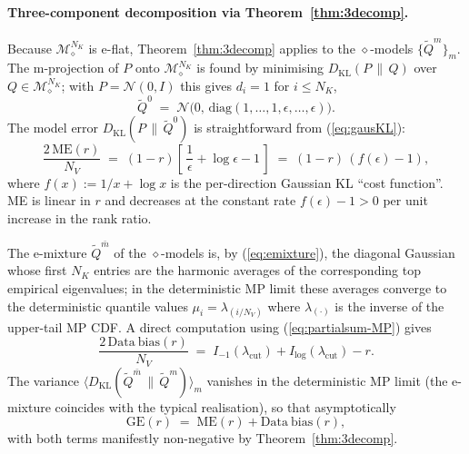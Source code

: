 \documentclass[11pt,a4paper]{article}
\theoremstyle{definition}
\theoremstyle{remark}
\newcommand{\KL}{D_{\mathrm{KL}}}
\newcommand{\PV}{P}
\newcommand{\NK}{N_K}
\newcommand{\NV}{N_V}
\newcommand{\Mfam}{\mathcal{M}}
\begin{document}
\paragraph{Three-component decomposition via Theorem~\ref{thm:3decomp}.}
Because $\Mfam_{\diamond}^{\NK}$ is e-flat,
Theorem~\ref{thm:3decomp} applies to the $\diamond$-models
$\{\widetilde{Q}^{m}\}_{m}$. The m-projection of $\PV$ onto
$\Mfam_{\diamond}^{\NK}$ is found by minimising
$\KL(\PV \,\|\, Q)$ over $Q \in \Mfam_{\diamond}^{\NK}$; with
$\PV = \mathcal{N}(0, I)$ this gives $d_{i} = 1$ for $i \leq \NK$,
\begin{equation}
  \widetilde{Q}^{0}
  \;=\;
  \mathcal{N}\!\big(0,\, \mathrm{diag}(1,\ldots,1,
                                        \epsilon,\ldots,\epsilon)\big).
  \label{eq:Q0diamond}
\end{equation}
The model error $\KL(\PV \,\|\, \widetilde{Q}^{0})$ is
straightforward from (\ref{eq:gausKL}):
\begin{equation}
  \frac{2\,\mathrm{ME}(r)}{\NV}
  \;=\;
  (1-r)\!\left[\,\frac{1}{\epsilon} + \log\epsilon - 1\,\right]
  \;=\;
  (1-r)\,(f(\epsilon) - 1),
  \label{eq:ME-r}
\end{equation}
where $f(x) := 1/x + \log x$ is the per-direction Gaussian KL
``cost function''. ME is linear in $r$ and decreases at the
constant rate $f(\epsilon) - 1 > 0$ per unit increase in the
rank ratio.

The e-mixture $\widetilde{Q}^{\bar{m}}$ of the $\diamond$-models
is, by (\ref{eq:emixture}), the diagonal Gaussian whose first
$\NK$ entries are the harmonic averages of the corresponding
top empirical eigenvalues; in the deterministic MP limit these
averages converge to the deterministic quantile values
$\mu_{i} = \lambda_{(i/\NV)}$ where $\lambda_{(\cdot)}$ is the
inverse of the upper-tail MP CDF. A direct computation using
(\ref{eq:partialsum-MP}) gives
\begin{equation}
  \frac{2\,\mathrm{Data\ bias}(r)}{\NV}
  \;=\;
  I_{-1}(\lambda_{\mathrm{cut}}) + I_{\log}(\lambda_{\mathrm{cut}}) - r .
  \label{eq:DB-r}
\end{equation}
The variance $\langle\KL(\widetilde{Q}^{\bar{m}}\,\|\,
\widetilde{Q}^{m})\rangle_{m}$ vanishes in the deterministic
MP limit (the e-mixture coincides with the typical realisation),
so that asymptotically
\begin{equation}
  \mathrm{GE}(r) \;=\; \mathrm{ME}(r) + \mathrm{Data\ bias}(r) ,
  \label{eq:GE-decomp-asymp}
\end{equation}
with both terms manifestly non-negative by
Theorem~\ref{thm:3decomp}.
\end{document}
